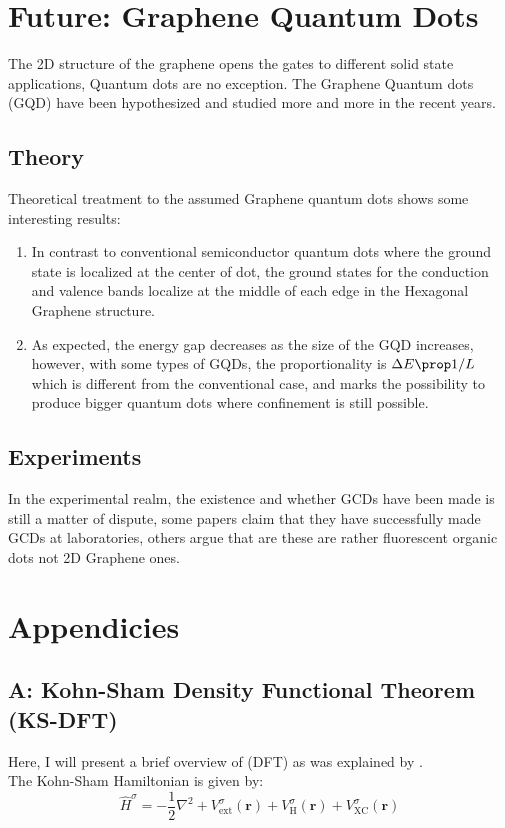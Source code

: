 \documentclass[twoside,11pt]{article}
\begin{document}
\section{Future: Graphene Quantum Dots}
    The 2D structure of the graphene opens the gates to different solid state applications, Quantum dots are no exception. The Graphene Quantum dots (GQD) have been hypothesized and studied more and more in the recent years.
    \subsection{Theory}
    Theoretical treatment to the assumed Graphene quantum dots shows some interesting results:
    \begin{enumerate}
        \item In contrast to conventional semiconductor quantum dots where the ground state is localized at the center of dot, the ground states for the conduction and valence bands localize at the middle of each edge in the Hexagonal Graphene structure. \cite{zhang2008tuning}
        
        \item As expected, the energy gap decreases as the size of the GQD increases, however, with some types of GQDs, the proportionality is $\Delta E \prop 1/L$ which is different from the conventional case, and marks the possibility to produce bigger quantum dots where confinement is still possible.\cite{zhang2008tuning}
    \end{enumerate}

    \subsection{Experiments}
    In the experimental realm, the existence and whether GCDs have been made is still a matter of dispute, some papers claim that they have successfully made GCDs at laboratories\cite{silvestrov2007quantum}, others argue that are these are rather fluorescent organic dots not 2D Graphene ones.\cite{pu2018colloidal}

\section*{Appendicies}
    \subsection*{A: Kohn-Sham Density Functional Theorem (KS-DFT)}
        Here, I will present a brief overview of (DFT) as was explained by \cite{sDFT}.\\
        The Kohn-Sham Hamiltonian is given by:
        \begin{equation}
            \hat{H}^\sigma = -\frac{1}{2} \nabla^2 + V^\sigma_{\text{ext}}(\mathbf{r}) + V^\sigma_{\text{H}}(\mathbf{r}) + V^\sigma_{\text{XC}}(\mathbf{r})
            \label{KSSDFT hamiltonian}
        \end{equation}
        
\end{document}
